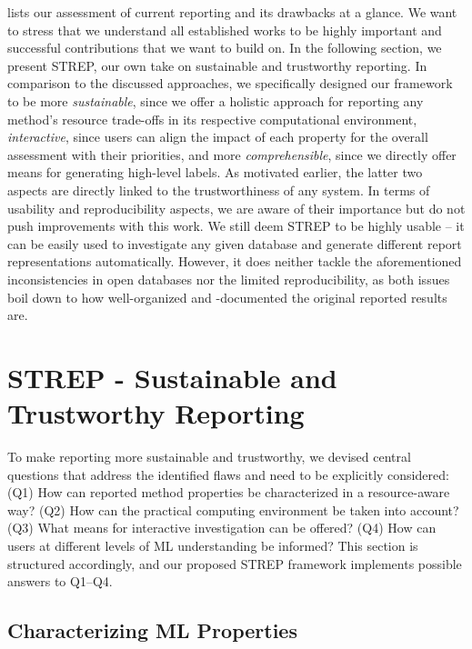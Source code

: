 \documentclass[sn-mathphys,Numbered]{sn-jnl}%
\theoremstyle{thmstylethree}%
\begin{document}
 lists our assessment of current reporting and its drawbacks at a glance.
We want to stress that we understand all established works to be highly important and successful contributions that we want to build on.
In the following section, we present STREP, our own take on sustainable and trustworthy reporting.
In comparison to the discussed approaches, we specifically designed our framework to be more
\emph{sustainable}, since we offer a holistic approach for reporting any method's resource trade-offs in its respective computational environment,
\emph{interactive}, since users can align the impact of each property for the overall assessment with their priorities, and more
\emph{comprehensible}, since we directly offer means for generating high-level labels.
As motivated earlier, the latter two aspects are directly linked to the trustworthiness of any system.
In terms of usability and reproducibility aspects, we are aware of their importance but do not push improvements with this work.
We still deem STREP to be highly usable -- it can be easily used to investigate any given database and generate different report representations automatically.
However, it does neither tackle the aforementioned inconsistencies in open databases nor the limited reproducibility, as both issues boil down to how well-organized and -documented the original reported results are.










\section{STREP - Sustainable and Trustworthy Reporting}

To make reporting more sustainable and trustworthy, we devised central questions that address the identified flaws and need to be explicitly considered:
(Q1) How can reported method properties be characterized in a resource-aware way?
(Q2) How can the practical computing environment be taken into account?
(Q3) What means for interactive investigation can be offered?
(Q4) How can users at different levels of ML understanding be informed?
This section is structured accordingly, and our proposed STREP framework implements possible answers to Q1--Q4.

\subsection{Characterizing ML Properties}
\label{sec:meth:characterizing}
\end{document}
